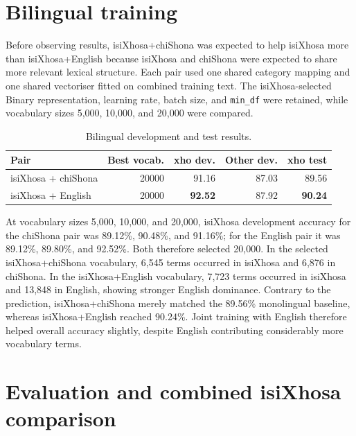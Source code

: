 \documentclass[10pt,a4paper]{article}
\begin{document}
\section{Bilingual training}

Before observing results, isiXhosa+chiShona was expected to help isiXhosa more than isiXhosa+English because isiXhosa and chiShona were expected to share more relevant lexical structure. Each pair used one shared category mapping and one shared vectoriser fitted on combined training text. The isiXhosa-selected Binary representation, learning rate, batch size, and \texttt{min\_df} were retained, while vocabulary sizes 5,000, 10,000, and 20,000 were compared.

\begin{table}[htbp]
\centering
\small
\caption{Bilingual development and test results.}
\begin{tabular}{lrrrr}
\toprule
Pair & Best vocab. & xho dev. & Other dev. & xho test\\
\midrule
isiXhosa + chiShona & 20000 & 91.16 & 87.03 & 89.56\\
isiXhosa + English & 20000 & \textbf{92.52} & 87.92 & \textbf{90.24}\\
\bottomrule
\end{tabular}
\end{table}

At vocabulary sizes 5,000, 10,000, and 20,000, isiXhosa development accuracy for the chiShona pair was 89.12\%, 90.48\%, and 91.16\%; for the English pair it was 89.12\%, 89.80\%, and 92.52\%. Both therefore selected 20,000. In the selected isiXhosa+chiShona vocabulary, 6,545 terms occurred in isiXhosa and 6,876 in chiShona. In the isiXhosa+English vocabulary, 7,723 terms occurred in isiXhosa and 13,848 in English, showing stronger English dominance. Contrary to the prediction, isiXhosa+chiShona merely matched the 89.56\% monolingual baseline, whereas isiXhosa+English reached 90.24\%. Joint training with English therefore helped overall accuracy slightly, despite English contributing considerably more vocabulary terms.

\section{Evaluation and combined isiXhosa comparison}
\end{document}
